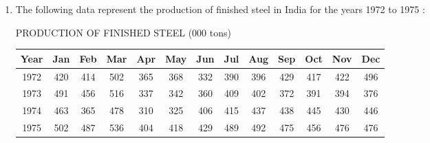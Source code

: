 \documentclass[11pt, a4paper]{article}
\begin{document}
\begin{enumerate}
	
	
	
	
	
	
	
	
	
	
	
	
	
	
	
	
	
	
	
	
	
	
	
	
	
	
	\item The following data represent the production of finished steel in India for the years 1972 to 1975 :
	
	\begin{center}
		PRODUCTION OF FINISHED STEEL (000 tons)
	\end{center}
	
	\begin{table}[h]
	\def\arraystretch{1.5}
	
	\begin{center}
	\begin{tabular}{|c||c|c|c|c|c|c|c|c|c|c|c|c|}
	
	
	\hline
	
	Year & Jan & Feb & Mar & Apr & May & Jun & Jul & Aug & Sep & Oct & Nov & Dec \\
	
	\hline
	
	1972 & 420 & 414 & 502 & 365 & 368 & 332 & 390 & 396 & 429 & 417 & 422 & 496 \\
	
	1973 & 491 & 456 & 516 & 337 & 342 & 360 & 409 & 402 & 372 & 391 & 394 & 376 \\
	
	1974 & 463 & 365 & 478 & 310 & 325 & 406 & 415 & 437 & 438 & 445 & 430 & 446 \\
	
	1975 & 502 & 487 & 536 & 404 & 418 & 429 & 489 & 492 & 475 & 456 & 476 & 476 \\
	
	\hline
	
	\end{tabular}
	\end{center}
	
	\end{table}
	

\end{enumerate}
\end{document}
